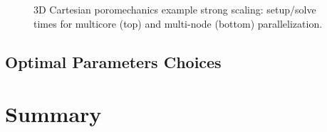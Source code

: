 \begin{figure} [htbp]
  \begin{subfigure}[t]{0.48\textwidth}
    \centering
    
  \end{subfigure}
  \hfill
  \begin{subfigure}[t]{0.48\textwidth}
    \centering
    
  \end{subfigure}
  \begin{subfigure}[t]{0.48\textwidth}
    \centering
    
  \end{subfigure}
  \hfill
  \begin{subfigure}[t]{0.48\textwidth}
    \centering
    \remake
    
  \end{subfigure}
  \caption[3D Cartesian poromechanics example strong scaling]{3D Cartesian poromechanics example strong scaling: setup/solve times for multicore (top) and multi-node (bottom) parallelization.}
  \label{fig:cart_scaling_strong_poro}
\end{figure}

\subsection{Optimal Parameters Choices}

\section{Summary}
\label{sec:par_summary}